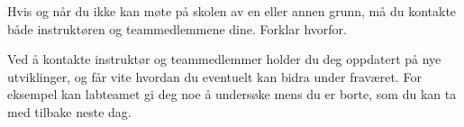 
Hvis og når du ikke kan møte på skolen av en eller annen grunn, må du kontakte både instruktøren og teammedlemmene dine. Forklar hvorfor.







Ved å kontakte instruktør og teammedlemmer holder du deg oppdatert på nye utviklinger, og får vite hvordan du eventuelt kan bidra under fraværet. For eksempel kan labteamet gi deg noe å undersøke mens du er borte, som du kan ta med tilbake neste dag.










